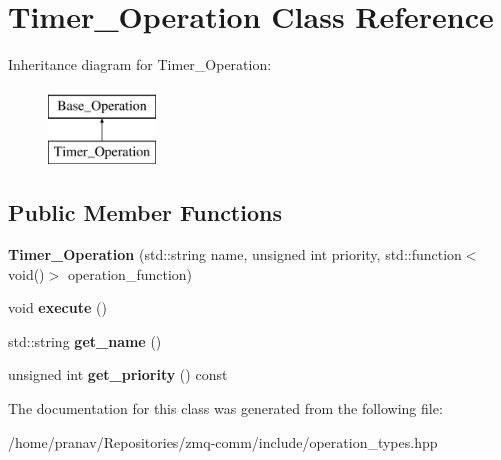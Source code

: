\hypertarget{classTimer__Operation}{}\section{Timer\+\_\+\+Operation Class Reference}
\label{classTimer__Operation}
Inheritance diagram for Timer\+\_\+\+Operation\+:\begin{figure}[H]
\begin{center}
\leavevmode
\includegraphics[height=2.000000cm]{classTimer__Operation}
\end{center}
\end{figure}
\subsection*{Public Member Functions}
\begin{DoxyCompactItemize}
\item 
{\bfseries Timer\+\_\+\+Operation} (std\+::string name, unsigned int priority, std\+::function$<$ void()$>$ operation\+\_\+function)\hypertarget{classTimer__Operation_ac964edca7ceffca9d55b081e0142ac8a}{}\label{classTimer__Operation_ac964edca7ceffca9d55b081e0142ac8a}

\item 
void {\bfseries execute} ()\hypertarget{classTimer__Operation_a9d20628449efe98de6628c7bd03d4dd4}{}\label{classTimer__Operation_a9d20628449efe98de6628c7bd03d4dd4}

\item 
std\+::string {\bfseries get\+\_\+name} ()\hypertarget{classBase__Operation_a878dd0e855a78907e4c828b1d70587d0}{}\label{classBase__Operation_a878dd0e855a78907e4c828b1d70587d0}

\item 
unsigned int {\bfseries get\+\_\+priority} () const \hypertarget{classBase__Operation_a0d561f85d2454f7c5abbe9d0e264a98a}{}\label{classBase__Operation_a0d561f85d2454f7c5abbe9d0e264a98a}

\end{DoxyCompactItemize}


The documentation for this class was generated from the following file\+:\begin{DoxyCompactItemize}
\item 
/home/pranav/\+Repositories/zmq-\/comm/include/operation\+\_\+types.\+hpp\end{DoxyCompactItemize}

